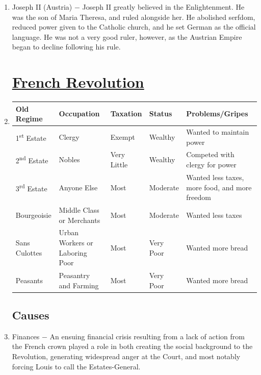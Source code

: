 \documentclass[12pt]{article}
\begin{document}
\begin{enumerate}
\item Joseph II (Austria) $-$ Joseph II greatly believed in the Enlightenment. He was the son of Maria Theresa, and ruled alongside her. He abolished serfdom, reduced power given to the Catholic church, and he set German as the official language. He was not a very good ruler, however, as the Austrian Empire began to decline following his rule.


\section{\underline{French Revolution}} 

\item \begin{tabular}{p{} p{} p{} p{} p{}}

Old Regime & Occupation & Taxation & Status & Problems/Gripes\\
\hline
1\textsuperscript{st} Estate & Clergy & Exempt & Wealthy & Wanted to maintain power \\
\hline
2\textsuperscript{nd} Estate & Nobles & Very Little & Wealthy & Competed with clergy for power \\
\hline
3\textsuperscript{rd} Estate & Anyone Else & Most & Moderate & Wanted less taxes, more food, and more freedom \\
\hline
Bourgeoisie & Middle Class or Merchants & Most & Moderate & Wanted less taxes \\
\hline
Sans Culottes & Urban Workers or Laboring Poor & Most & Very Poor & Wanted more bread  \\
\hline
Peasants & Peasantry and Farming & Most & Very Poor & Wanted more bread \\
\hline

\end{tabular}

\subsection{Causes}

\item Finances $-$ An ensuing financial crisis resulting from a lack of action from the French crown played a role in both creating the social background to the Revolution, generating widespread anger at the Court, and most notably forcing Louis to call the Estates-General. 

\begin{enumerate}[label=\arabic{*}.]
\setcounter{enumii}{291}


\end{enumerate}
\end{enumerate}
\end{document}
